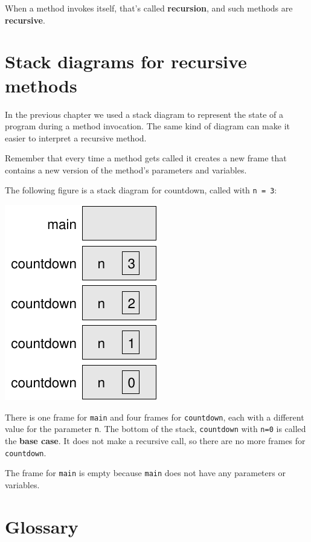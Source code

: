 
When a method invokes itself, that's called {\bf recursion}, and
such methods are {\bf recursive}.


\section{Stack diagrams for recursive methods}

In the previous chapter we used a stack diagram to represent the
state of a program during a method invocation.  The same kind
of diagram can make it easier to interpret a recursive method.

Remember that every time a method gets called it creates
a new frame that contains a new version of
the method's parameters and variables.

The following figure is a stack diagram for countdown, called
with {\tt n = 3}:

\includegraphics{figs/stack2.pdf}

There is one frame for {\tt main} and four frames for {\tt countdown},
each with a different value for the parameter {\tt n}.  The bottom of
the stack, {\tt countdown} with {\tt n=0} is called the {\bf base
  case}.  It does not make a recursive call, so there are no more
frames for {\tt countdown}.

The frame for {\tt main} is empty because {\tt main} does not
have any parameters or variables.


\section{Glossary}

